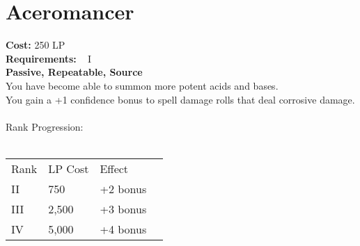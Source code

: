 \section{Aceromancer}\label{perk:aceromancer}
\textbf{Cost:} 250 LP\\
\textbf{Requirements:} ~ I\\
\textbf{Passive, Repeatable, Source}\\
You have become able to summon more potent acids and bases.\\
You gain a +1 confidence bonus to spell damage rolls that deal corrosive damage.\\
\\
Rank Progression:\\
\\
\begin{longtable}{l | l | l | l}
    Rank & LP Cost  &  Effect\\
    II & 750 & +2 bonus\\
    III & 2,500 & +3 bonus\\
    IV & 5,000 & +4 bonus\\
\end{longtable}
